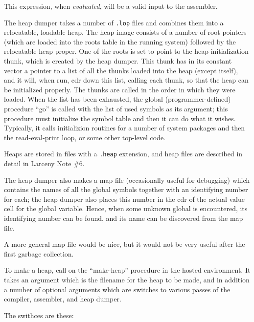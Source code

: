 \noindent This expression, when {\em evaluated}, will be a valid input to the
assembler.

The heap dumper takes a number of {\tt .lop} files and combines them
into a relocatable, loadable heap. The heap image consists of a number
of root pointers (which are loaded into the roots table in the running
system) followed by the relocatable heap proper. One of the roots is
set to point to the heap initialization thunk, which is created by the
heap dumper. This thunk has in its constant vector a pointer to a list
of all the thunks loaded into the heap (except itself), and it will,
when run, cdr down this list, calling each thunk, so that the heap can
be initialized properly. The thunks are called in the order in which
they were loaded. When the list has been exhausted, the global
(programmer-defined) procedure ``go'' is called with the list of used
symbols as its argument; this procedure must initialize the symbol
table and then it can do what it wishes. Typically, it calls
initializion routines for a number of system packages and then the
read-eval-print loop, or some other top-level code.

Heaps are stored in files with a {\tt .heap} extension, and heap files
are described in detail in Larceny Note \#6.

The heap dumper also makes a map file (occasionally useful for
debugging) which contains the names of all the global symbols together
with an identifying number for each; the heap dumper also places this
number in the cdr of the actual value cell for the global variable.
Hence, when some unknown global is encountered, its identifying number
can be found, and its name can be discovered from the map file.

A more general map file would be nice, but it would not be very useful
after the first garbage collection.

To make a heap, call on the ``make-heap'' procedure in the hosted
environment. It takes an argument which is the filename for the heap
to be made, and in addition a number of optional arguments which are
switches to various passes of the compiler, assembler, and heap
dumper.

The swithces are these:

